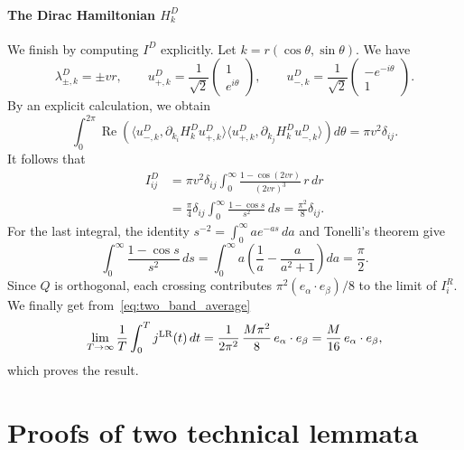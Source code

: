 \documentclass[a4paper,11pt]{article}
\theoremstyle{plain}
\theoremstyle{remark}
\def\1{{\mathds 1}}
\begin{document}
\paragraph{The Dirac Hamiltonian $H_k^D$}
We finish by computing $I^D$ explicitly. Let
$k=r(\cos\theta,\sin\theta)$. We have
\[
\lambda^D_{\pm,k}=\pm vr,\qquad
u^D_{+,k}=\frac1{\sqrt2}\begin{pmatrix}1\\e^{i\theta}\end{pmatrix},
\qquad
u^D_{-,k}=\frac1{\sqrt2}\begin{pmatrix}-e^{-i\theta}\\1\end{pmatrix}.
\]
By an explicit calculation, we obtain
\[
\int_0^{2\pi}\operatorname{Re}\left(
\langle u^D_{-,k},\partial_{k_i}H_k^D u^D_{+,k}\rangle
\langle u^D_{+,k},\partial_{k_j}H_k^D u^D_{-,k}\rangle\right)d\theta
=\pi v^2\delta_{ij}.
\]
It follows that
\begin{align*}
I_{ij}^D
&=\pi v^2\delta_{ij}\int_0^\infty
\frac{1-\cos(2vr)}{(2vr)^3}\,r\,dr\\
&=\frac\pi4\delta_{ij}\int_0^\infty\frac{1-\cos s}{s^2}\,ds
=\frac{\pi^2}{8}\delta_{ij}.
\end{align*}
For the last integral, the identity
$s^{-2}=\int_0^\infty a e^{-as}\,da$ and Tonelli's theorem give
\[
\int_0^\infty\frac{1-\cos s}{s^2}\,ds
=\int_0^\infty a\left(\frac1a-\frac{a}{a^2+1}\right)da
=\frac\pi2.
\]
Since $Q$ is orthogonal, each crossing contributes
$\pi^2(e_\alpha\cdot e_\beta)/8$ to the limit of $I_i^R$.
We finally get from~\eqref{eq:two_band_average}
\[
\lim_{T\to\infty}\frac1T\int_0^T j^{\rm LR}(t)\,dt
=\frac1{2\pi^2}\,\frac{M\pi^2}{8}\,e_\alpha\cdot e_\beta
=\frac{M}{16}\,e_\alpha\cdot e_\beta,
\]
which proves the result.


\appendix


\section{Proofs of two technical lemmata}
\end{document}
